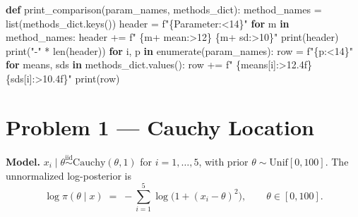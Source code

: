 \documentclass[
  letterpaper,
  DIV=11,
  numbers=noendperiod]{scrartcl}
\newenvironment{Shaded}{\begin{snugshade}}{\end{snugshade}}
\newcommand{\BuiltInTok}[1]{\textcolor[rgb]{0.00,0.23,0.31}{#1}}
\newcommand{\ControlFlowTok}[1]{\textcolor[rgb]{0.00,0.23,0.31}{\textbf{#1}}}
\newcommand{\KeywordTok}[1]{\textcolor[rgb]{0.00,0.23,0.31}{\textbf{#1}}}
\newcommand{\NormalTok}[1]{\textcolor[rgb]{0.00,0.23,0.31}{#1}}
\newcommand{\OperatorTok}[1]{\textcolor[rgb]{0.37,0.37,0.37}{#1}}
\newcommand{\SpecialCharTok}[1]{\textcolor[rgb]{0.37,0.37,0.37}{#1}}
\newcommand{\SpecialStringTok}[1]{\textcolor[rgb]{0.13,0.47,0.30}{#1}}
\newcommand{\StringTok}[1]{\textcolor[rgb]{0.13,0.47,0.30}{#1}}
\begin{document}
\begin{Shaded}
\begin{Highlighting}[]
\KeywordTok{def}\NormalTok{ print\_comparison(param\_names, methods\_dict):}
\NormalTok{    method\_names }\OperatorTok{=} \BuiltInTok{list}\NormalTok{(methods\_dict.keys())}
\NormalTok{    header }\OperatorTok{=} \SpecialStringTok{f"}\SpecialCharTok{\{}\StringTok{\textquotesingle{}Parameter\textquotesingle{}}\SpecialCharTok{:\textless{}14\}}\SpecialStringTok{"}
    \ControlFlowTok{for}\NormalTok{ m }\KeywordTok{in}\NormalTok{ method\_names:}
\NormalTok{        header }\OperatorTok{+=} \SpecialStringTok{f"  }\SpecialCharTok{\{}\NormalTok{m}\OperatorTok{+}\StringTok{\textquotesingle{} mean\textquotesingle{}}\SpecialCharTok{:\textgreater{}12\}}\SpecialStringTok{  }\SpecialCharTok{\{}\NormalTok{m}\OperatorTok{+}\StringTok{\textquotesingle{} sd\textquotesingle{}}\SpecialCharTok{:\textgreater{}10\}}\SpecialStringTok{"}
    \BuiltInTok{print}\NormalTok{(header)}
    \BuiltInTok{print}\NormalTok{(}\StringTok{"{-}"} \OperatorTok{*} \BuiltInTok{len}\NormalTok{(header))}
    \ControlFlowTok{for}\NormalTok{ i, p }\KeywordTok{in} \BuiltInTok{enumerate}\NormalTok{(param\_names):}
\NormalTok{        row }\OperatorTok{=} \SpecialStringTok{f"}\SpecialCharTok{\{}\NormalTok{p}\SpecialCharTok{:\textless{}14\}}\SpecialStringTok{"}
        \ControlFlowTok{for}\NormalTok{ means, sds }\KeywordTok{in}\NormalTok{ methods\_dict.values():}
\NormalTok{            row }\OperatorTok{+=} \SpecialStringTok{f"  }\SpecialCharTok{\{}\NormalTok{means[i]}\SpecialCharTok{:\textgreater{}12.4f\}}\SpecialStringTok{  }\SpecialCharTok{\{}\NormalTok{sds[i]}\SpecialCharTok{:\textgreater{}10.4f\}}\SpecialStringTok{"}
        \BuiltInTok{print}\NormalTok{(row)}
\end{Highlighting}
\end{Shaded}

\newpage

\section{Problem 1 --- Cauchy Location}\label{problem-1-cauchy-location}

\textbf{Model.}
\(x_i \mid \theta \overset{\text{iid}}{\sim} \text{Cauchy}(\theta, 1)\)
for \(i=1,\dots,5\), with prior \(\theta \sim \text{Unif}[0, 100]\). The
unnormalized log-posterior is \[
\log \pi(\theta \mid x) \;=\; -\sum_{i=1}^{5} \log\!\bigl(1 + (x_i - \theta)^2\bigr), \qquad \theta \in [0, 100].
\]
\end{document}
